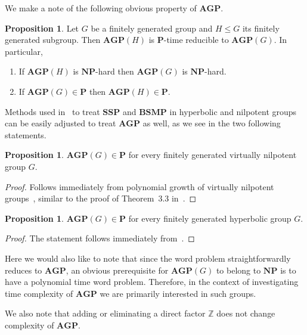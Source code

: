 \documentclass[10pt]{amsart}
\newcommand{\an}{\noindent\color{red} Andrey: }{}
\theoremstyle{definition}
\newtheorem{proposition}[theorem]{Proposition}
\def\P{{\mathbf{P}}}
\def\NP{{\mathbf{NP}}}
\def\SSP{{\mathbf{SSP}}}
\def\BSMP{{\mathbf{BSMP}}}
\def\AGP{{\mathbf{AGP}}}
\begin{document}
We make a note of the following obvious property of $\AGP$.

\begin{proposition}\label{pr:subgroup}
Let $G$ be a finitely generated group and $H\le G$ its finitely generated subgroup. Then $\AGP(H)$ is $\P$-time reducible to $\AGP(G)$. In particular,
\begin{enumerate}
\item If $\AGP(H)$ is $\NP$-hard then $\AGP(G)$ is $\NP$-hard.
\item If $\AGP(G)\in \P$ then $\AGP(H)\in \P$.
\end{enumerate}
\end{proposition}

Methods used in~\cite{Miasnikov-Nikolaev-Ushakov:2014a} to treat $\SSP$ and $\BSMP$ in hyperbolic and nilpotent groups can be easily adjusted to treat $\AGP$ as well, as we see in the two following statements.
\begin{proposition}\label{pr:agp_nilp}
$\AGP(G)\in\P$ for every finitely generated virtually nilpotent group $G$.
\end{proposition}
\begin{proof}
Follows immediately from polynomial growth of virtually nilpotent groups~\cite{Wolf}, similar to the proof of Theorem~3.3 in~\cite{Miasnikov-Nikolaev-Ushakov:2014a}.
\end{proof}

\begin{proposition}\label{pr:agp_hyp}
$\AGP(G)\in\P$ for every finitely generated hyperbolic group $G$.
\end{proposition}
\begin{proof}
The statement follows immediately from~\cite[Proposition 5.5]{Miasnikov-Nikolaev-Ushakov:2014a}.
\end{proof}
Here we would also like to note that since the word problem straightforwardly reduces to $\AGP$, an obvious prerequisite for $\AGP(G)$ to belong to $\NP$ is to have a polynomial time word problem. Therefore, in the context of investigating time complexity of $\AGP$ we are primarily interested in such groups.

We also note that adding or eliminating a direct factor $\mathbb Z$ does not change complexity of $\AGP$.
%
%
%
%
\end{document}
